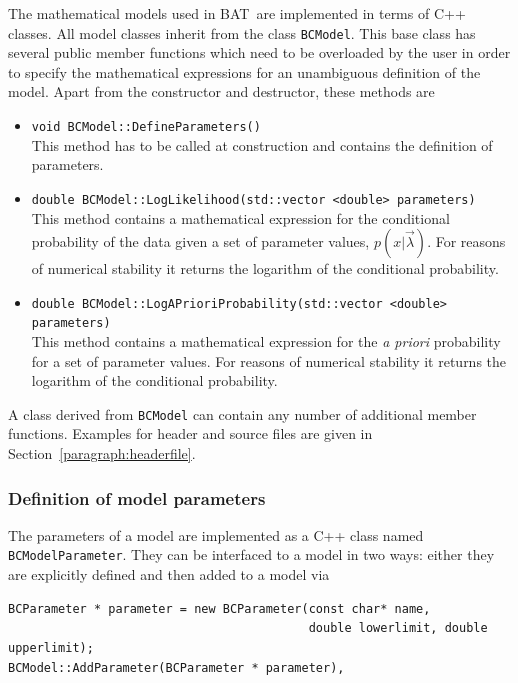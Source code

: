 \documentclass[11pt, a4paper]{article}
\newcommand{\BAT}{{\sc BAT}}
\begin{document}
The mathematical models used in \BAT\ are implemented in terms of C++
classes. All model classes inherit from the class \verb|BCModel|. This
base class has several public member functions which need to be
overloaded by the user in order to specify the mathematical
expressions for an unambiguous definition of the model. Apart from the
constructor and destructor, these methods are
% 
\begin{itemize}
\item \verb|void BCModel::DefineParameters()| \\
This method has to be called at construction and contains the
definition of parameters.
% 
\item \verb|double BCModel::LogLikelihood(std::vector <double> parameters)| \\ 
This method contains a mathematical expression for the conditional
probability of the data given a set of parameter values,
$p(x|\vec{\lambda})$. For reasons of numerical stability it returns
the logarithm of the conditional probability.
%
\item \verb|double BCModel::LogAPrioriProbability(std::vector <double> parameters)| \\
This method contains a mathematical expression for the {\it a priori}
probability for a set of parameter values. For reasons of numerical
stability it returns the logarithm of the conditional probability.
\end{itemize} 

\noindent 
A class derived from \verb|BCModel| can contain any number of
additional member functions. Examples for header and source files are
given in Section~\ref{paragraph:headerfile}.


\subsubsection{Definition of  model parameters} 
\label{subsubsection:parameters}

The parameters of a model are implemented as a C++ class named
\verb|BCModelParameter|. They can be interfaced to a model in two
ways: either they are explicitly defined and then added to a model via
%
\begin{verbatim}
BCParameter * parameter = new BCParameter(const char* name, 
                                          double lowerlimit, double upperlimit); 
BCModel::AddParameter(BCParameter * parameter),
\end{verbatim}
\end{document}

